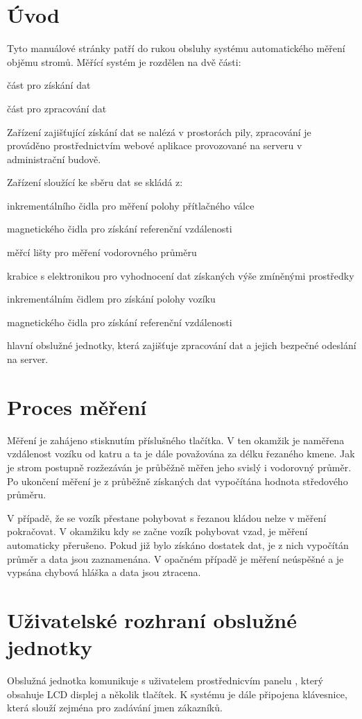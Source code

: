 \section{Úvod}\label{Manual_uvod}
Tyto manuálové stránky patří do rukou obsluhy systému automatického měření objěmu stromů. Měřící systém je rozdělen na dvě části:
\begin{DoxyItemize}
\item část pro získání dat
\item část pro zpracování dat
\end{DoxyItemize}

Zařízení zajišťující získání dat se nalézá v prostorách pily, zpracování je prováděno prostřednictvím webové aplikace provozované na serveru v administrační budově.

Zařízení sloužící ke sběru dat se skládá z:
\begin{DoxyItemize}
\item inkrementálního čidla pro měření polohy přítlačného válce
\item magnetického čidla pro získání referenční vzdálenosti
\item měřcí lišty pro měření vodorovného průměru
\item krabice s elektronikou pro vyhodnocení dat získaných výše zmíněnými prostředky
\item inkrementálním čidlem pro získání polohy vozíku
\item magnetického čidla pro získání referenční vzdálenosti
\item hlavní obslužné jednotky, která zajišťuje zpracování dat a jejich bezpečné odeslání na server.
\end{DoxyItemize}\section{Proces měření}\label{Manual_proces_mereni}
Měření je zahájeno stisknutím příslušného tlačítka. V ten okamžik je naměřena vzdálenost vozíku od katru a ta je dále považována za délku řezaného kmene. Jak je strom postupně rozžezáván je průběžně měřen jeho svislý i vodorovný průměr. Po ukončení měření je z průběžně získaných dat vypočítána hodnota středového průměru.

V případě, že se vozík přestane pohybovat s řezanou kládou nelze v měření pokračovat. V okamžiku kdy se začne vozík pohybovat vzad, je měření automaticky přerušeno. Pokud již bylo získáno dostatek dat, je z nich vypočítán průměr a data jsou zaznamenána. V opačném případě je měření neúspěšné a je vypsána chybová hláška a data jsou ztracena.\section{Uživatelské rozhraní obslužné jednotky}\label{Manual_obsluzna_jednotka}
Obslužná jednotka komunikuje s uživatelem prostřednicvím panelu , který obsahuje LCD displej a několik tlačítek. K systému je dále připojena klávesnice, která slouží zejména pro zadávání jmen zákazníků.

